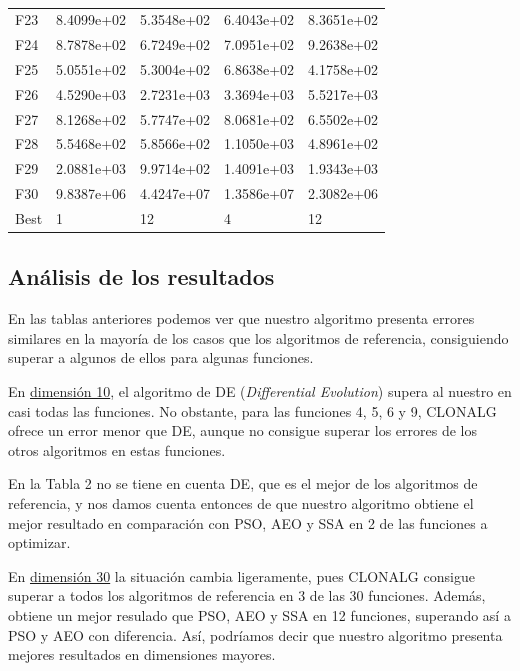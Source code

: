 \documentclass[10pt,a4paper]{article}
\begin{document}
\begin{table}[H]
\begin{center}
\begin{tabular}{lllll}
	F23  &  8.4099e+02 &  5.3548e+02 &  6.4043e+02 &  8.3651e+02 \\
	F24  &  8.7878e+02 &  6.7249e+02 &  7.0951e+02 &  9.2638e+02 \\
	F25  &  5.0551e+02 &  5.3004e+02 &  6.8638e+02 &  4.1758e+02 \\
	F26  &  4.5290e+03 &  2.7231e+03 &  3.3694e+03 &  5.5217e+03 \\
	F27  &  8.1268e+02 &  5.7747e+02 &  8.0681e+02 &  6.5502e+02 \\
	F28  &  5.5468e+02 &  5.8566e+02 &  1.1050e+03 &  4.8961e+02 \\
	F29  &  2.0881e+03 &  9.9714e+02 &  1.4091e+03 &  1.9343e+03 \\
	F30  &  9.8387e+06 &  4.4247e+07 &  1.3586e+07 &  2.3082e+06 \\
	Best &           1 &          12 &           4 &          12 \\
	\bottomrule
\end{tabular}
	\caption{}
\end{center}
\end{table}
				
\newpage

	\subsection{ Análisis de los resultados }
	
	En las tablas anteriores podemos ver que nuestro algoritmo presenta errores similares en la mayoría de los casos que los algoritmos de referencia, consiguiendo superar a algunos de ellos para algunas funciones. 
	
	En \underline{dimensión 10}, el algoritmo de DE (\textit{Differential Evolution}) supera al nuestro en casi todas las funciones. No obstante, para las funciones 4, 5, 6 y 9, CLONALG  ofrece un error menor que DE, aunque no consigue superar los errores de los otros algoritmos en estas funciones. 
	
	En la Tabla 2 no se tiene en cuenta DE, que es el mejor de los algoritmos de referencia, y nos damos cuenta entonces de que nuestro algoritmo obtiene el mejor resultado en comparación con PSO, AEO y SSA en 2 de las funciones a optimizar. 
	
	En \underline{dimensión 30} la situación cambia ligeramente, pues CLONALG consigue superar a todos los algoritmos de referencia en 3 de las 30 funciones. Además, obtiene un mejor resulado que PSO, AEO y SSA en 12 funciones, superando así a PSO y AEO con diferencia. 
	Así, podríamos decir que nuestro algoritmo presenta mejores resultados en dimensiones mayores. 
	
\end{document}
